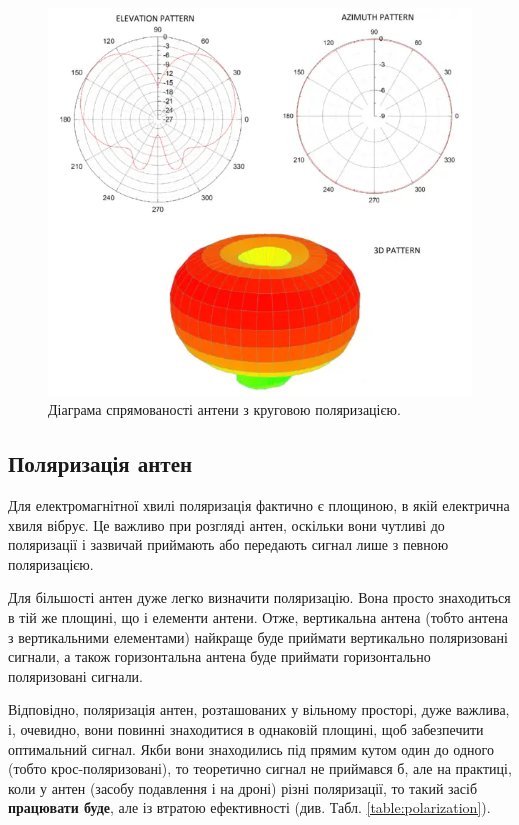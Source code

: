 \documentclass{article}
\begin{document}
\begin{figure}[H]
\centering
\includegraphics[width=0.5\linewidth]{images/omni-antenna.png}
\caption{\label{fig:omni:antenna}Діаграма спрямованості антени з круговою поляризацією.}
\end{figure}

\subsection{Поляризація антен}

Для електромагнітної хвилі поляризація фактично є площиною, в якій електрична хвиля вібрує. Це важливо при розгляді антен, оскільки вони чутливі до поляризації і зазвичай приймають або передають сигнал лише з певною поляризацією.

Для більшості антен дуже легко визначити поляризацію. Вона просто знаходиться в тій же площині, що і елементи антени. Отже, вертикальна антена (тобто антена з вертикальними елементами) найкраще буде приймати вертикально поляризовані сигнали, а також горизонтальна антена буде приймати горизонтально поляризовані сигнали.

Відповідно, поляризація антен, розташованих у вільному просторі, дуже важлива, і, очевидно, вони повинні знаходитися в однаковій площині, щоб забезпечити оптимальний сигнал. Якби вони знаходились під прямим кутом один до одного (тобто крос-поляризовані), то теоретично сигнал не приймався б, але на практиці, коли у антен (засобу подавлення і на дроні) різні поляризації, то такий засіб \textbf{працювати буде}, але із втратою ефективності (див. Табл. \ref{table:polarization}).
\end{document}
